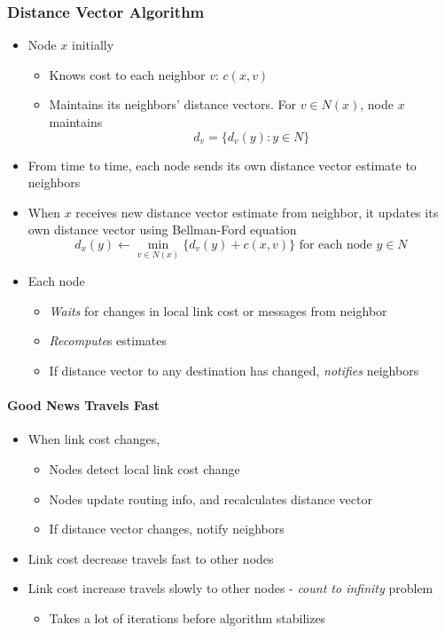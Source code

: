 \subsubsection{Distance Vector Algorithm}
\begin{itemize}
	\item Node \(x\) initially
	\begin{itemize}
		\item Knows cost to each neighbor \(v\): \(c(x, v)\)
		\item Maintains its neighbors' distance vectors. For \(v\in N(x)\), node \(x\) maintains
		\[
			d_v = \{d_v(y) : y\in N\}
		\]
	\end{itemize}
	\item From time to time, each node sends its own distance vector estimate to neighbors
	\item When \(x\) receives new distance vector estimate from neighbor, it updates its own distance vector using Bellman-Ford equation
	\[
		d_x(y) \leftarrow \min_{v \in N(x)} \{d_v(y) + c(x, v)\} \text{ for each node } y\in N
	\]
	\item Each node
	\begin{itemize}
		\item \textit{Waits} for changes in local link cost or messages from neighbor
		\item \textit{Recompute}s estimates
		\item If distance vector to any destination has changed, \textit{notifies} neighbors
	\end{itemize}
\end{itemize}

\paragraph{Good News Travels Fast}
\begin{itemize}
	\item When link cost changes,
	\begin{itemize}
		\item Nodes detect local link cost change
		\item Nodes update routing info, and recalculates distance vector
		\item If distance vector changes, notify neighbors
	\end{itemize}
	\item Link cost decrease travels fast to other nodes
	\item Link cost increase travels slowly to other nodes - \textit{count to infinity} problem
	\begin{itemize}
		\item Takes a lot of iterations before algorithm stabilizes 
	\end{itemize}
\end{itemize}

